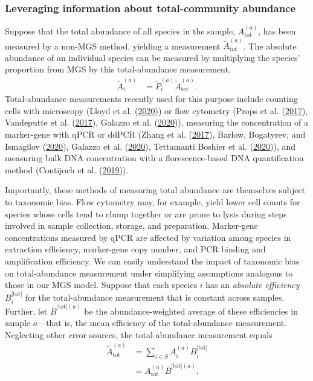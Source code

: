 \documentclass[
]{article}
\begin{document}
\hypertarget{leveraging-information-about-total-community-abundance}{%
\subsubsection{Leveraging information about total-community abundance}\label{leveraging-information-about-total-community-abundance}}

Suppose that the total abundance of all species in the sample, \(A_{{\text{tot}}}^{(a)}\), has been measured by a non-MGS method, yielding a measurement \(\tilde A_{\text{tot}}^{(a)}\).
The absolute abundance of an individual species can be measured by multiplying the species' proportion from MGS by this total-abundance measurement,
\begin{align}
  \label{eq:density-prop-meas}
  \tilde A_i^{(a)} &= \tilde P_i^{(a)} \tilde A_{\text{tot}}^{(a)}.
\end{align}
Total-abundance measurements recently used for this purpose include counting cells with microscopy (Lloyd et al. (\protect\hyperlink{ref-lloyd2020evid}{2020})) or flow cytometry (Props et al. (\protect\hyperlink{ref-props2017abso}{2017}), Vandeputte et al. (\protect\hyperlink{ref-vandeputte2017quan}{2017}), Galazzo et al. (\protect\hyperlink{ref-galazzo2020howt}{2020})), measuring the concentration of a marker-gene with qPCR or ddPCR (Zhang et al. (\protect\hyperlink{ref-zhang2017soil}{2017}), Barlow, Bogatyrev, and Ismagilov (\protect\hyperlink{ref-barlow2020aqau}{2020}), Galazzo et al. (\protect\hyperlink{ref-galazzo2020howt}{2020}), Tettamanti Boshier et al. (\protect\hyperlink{ref-tettamantiboshier2020comp}{2020})), and measuring bulk DNA concentration with a florescence-based DNA quantification method (Contijoch et al. (\protect\hyperlink{ref-contijoch2019gutm}{2019})).

Importantly, these methods of measuring total abundance are themselves subject to taxonomic bias.
Flow cytometry may, for example, yield lower cell counts for species whose cells tend to clump together or are prone to lysis during steps involved in sample collection, storage, and preparation.
Marker-gene concentrations measured by qPCR are affected by variation among species in extraction efficiency, marker-gene copy number, and PCR binding and amplification efficiency.
We can easily understand the impact of taxonomic bias on total-abundance measurement under simplifying assumptions analogous to those in our MGS model.
Suppose that each species \(i\) has an \emph{absolute efficiency} \(B_{i}^{{\text{[tot]}}}\) for the total-abundance measurement that is constant across samples.
Further, let \(\bar B^{{\text{[tot]}}(a)}\) be the abundance-weighted average of these efficiencies in sample \(a\)---that is, the mean efficiency of the total-abundance measurement.
Neglecting other error sources, the total-abundance measurement equals
\begin{align}
  \label{eq:total-density-error}
  \tilde A_{\text{tot}}^{(a)} 
  &= \sum_{i\in S} A_i^{(a)} B_{i}^{{\text{[tot]}}}
  \\&= A_{\text{tot}}^{(a)} \bar B^{{\text{[tot]}}(a)}.
\end{align}
\end{document}
